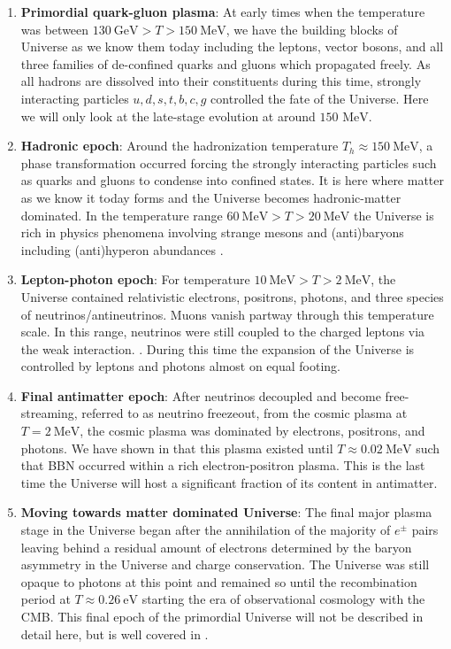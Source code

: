 \documentclass[universe,article,submit,moreauthors,pdftex,a4paper]{Definitions/mdpi}
\newcommand{\MeV}{\text{ MeV}}
\begin{document}
\begin{enumerate}
  \item \textbf{Primordial quark-gluon plasma}: At early times when the temperature was between $130\ \mathrm{GeV}>T>150\ \mathrm{MeV}$, we have the building blocks of Universe as we know them today including the leptons, vector bosons, and all three families of de-confined quarks and gluons which propagated freely. As all hadrons are dissolved into their constituents during this time, strongly interacting particles $u,d,s,t,b,c,g$ controlled the fate of the Universe. Here we will only look at the late-stage evolution at around $150\MeV$.
  \item \textbf{Hadronic epoch}: Around the hadronization temperature $T_h\approx150\ \mathrm{MeV}$, a phase transformation occurred forcing the strongly interacting particles such as quarks and gluons to condense into confined states. It is here where matter as we know it today forms and the Universe becomes hadronic-matter dominated. In the temperature range $ 60\ \mathrm{MeV}>T>20\ \mathrm{MeV}$ the Universe is rich in physics phenomena involving strange mesons and (anti)baryons including (anti)hyperon abundances \cite{Fromerth:2012fe,Yang:2021bko}.
  \item  \textbf{Lepton-photon epoch}: For temperature $10\ \mathrm{MeV}>T>2\ \mathrm{MeV}$, the Universe contained relativistic electrons, positrons, photons, and three species of neutrinos/antineutrinos. Muons vanish partway through this temperature scale. In this range, neutrinos were still coupled to the charged leptons via the weak interaction. \cite{Birrell:2012gg}. During this time the expansion of the Universe is controlled by leptons and photons almost on equal footing.
  \item  \textbf{Final antimatter epoch}: After neutrinos decoupled and become free-streaming, referred to as neutrino freezeout, from the cosmic plasma at $T=2\ \mathrm{MeV}$, the cosmic plasma was dominated by electrons, positrons, and photons. We have shown in \cite{Chris:2023abc} that this plasma existed until $T\approx0.02\ \mathrm{MeV}$ such that BBN occurred within a rich electron-positron plasma. This is the last time the Universe will host a significant fraction of its content in antimatter.
  \item \textbf{Moving towards matter dominated Universe}: The final major plasma stage in the Universe began after the annihilation of the majority of $e^{\pm}$ pairs leaving behind a residual amount of electrons determined by the baryon asymmetry in the Universe and charge conservation. The Universe was still opaque to photons at this point and remained so until the recombination period at $T\approx0.26\ \mathrm{eV}$ starting the era of observational cosmology with the CMB. This final epoch of the primordial Universe will not be described in detail here, but is well covered in \cite{Planck:2018vyg}.
\end{enumerate}
\end{document}
